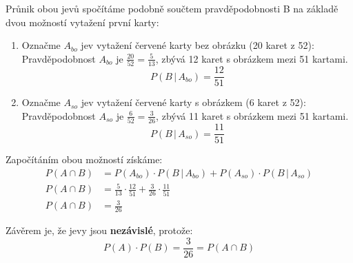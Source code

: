 \documentclass[12pt]{article}
\begin{document}
\begin{enumerate}
\begin{enumerate}
        Průnik obou jevů spočítáme podobně součtem pravděpodobnosti B na základě dvou možností vytažení první karty:
        \begin{enumerate}
          \item Označme $A_{bo}$ jev vytažení červené karty bez obrázku (20 karet z 52): Pravděpodobnost $A_{bo}$ je $\frac{20}{52} = \frac{5}{13}$,
            zbývá 12 karet s obrázkem mezi 51 kartami.
            \[
              P(B \,|\, A_{bo}) = \frac{12}{51}
            \]
          \item Označme $A_{so}$ jev vytažení červené karty s obrázkem (6 karet z 52): Pravděpodobnost $A_{so}$ je $\frac{6}{52} = \frac{3}{26}$,
            zbývá 11 karet s obrázkem mezi 51 kartami.
            \[
              P(B \,|\, A_{so}) = \frac{11}{51}
            \]
        \end{enumerate}
        Započítáním obou možností získáme:
        \begin{align*}
          P(A \cap B) &= P(A_{bo}) \cdot P(B \,|\, A_{bo}) + P(A_{so}) \cdot P(B \,|\, A_{so}) \\
          P(A \cap B) &= \frac{5}{13} \cdot \frac{12}{51} + \frac{3}{26} \cdot \frac {11}{51} \\
          P(A \cap B) &= \frac{3}{26}
        \end{align*}

        Závěrem je, že jevy jsou \textbf{nezávislé}, protože:
        \[
          P(A) \cdot P(B) = \frac{3}{26} = P(A \cap B)
        \]
    \end{enumerate}
\end{enumerate}
\end{document}
